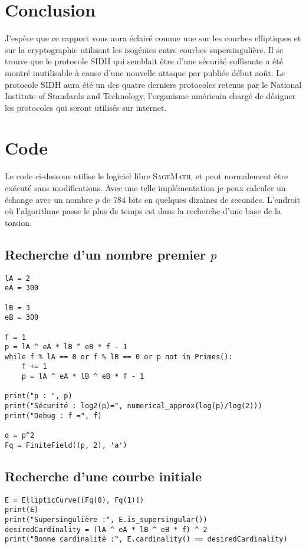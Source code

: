 \documentclass{article}
\theoremstyle{plain}%
\theoremstyle{definition}%
\begin{document}
\section*{Conclusion}

J'espère que ce rapport vous aura éclairé comme une sur les courbes elliptiques et sur la cryptographie utilisant les isogénies entre courbes supersingulière. Il se trouve que le protocole SIDH qui semblait être d'une sécurité suffisante a été montré inutilisable à cause d'une nouvelle attaque par \cite{castryck} publiée début août. Le protocole SIDH aura été un des quatre derniers protocoles retenus par le National Institute of Standards and Technology, l'organisme américain chargé de désigner les protocoles qui seront utilisés sur internet.






\appendix

\section{Code}

Le code ci-dessous utilise le logiciel libre \textsc{SageMath}, et peut normalement être exécuté sans modifications. Avec une telle implémentation je peux calculer un échange avec un nombre $p$ de $784$ bits en quelques dizaines de secondes. L'endroit où l'algorithme passe le plus de temps est dans la recherche d'une base de la torsion. 

\subsection*{Recherche d'un nombre premier $p$}
\begin{verbatim}
lA = 2
eA = 300

lB = 3
eB = 300

f = 1
p = lA ^ eA * lB ^ eB * f - 1
while f % lA == 0 or f % lB == 0 or p not in Primes():
    f += 1 
    p = lA ^ eA * lB ^ eB * f - 1
    
print("p : ", p)
print("Sécurité : log2(p)=", numerical_approx(log(p)/log(2)))
print("Debug : f =", f)

q = p^2
Fq = FiniteField((p, 2), 'a')
\end{verbatim}

\subsection*{Recherche d'une courbe initiale}
\begin{verbatim}
E = EllipticCurve([Fq(0), Fq(1)])
print(E)
print("Supersingulière :", E.is_supersingular())
desiredCardinality = (lA ^ eA * lB ^ eB * f) ^ 2
print("Bonne cardinalité :", E.cardinality() == desiredCardinality)
\end{verbatim}
\end{document}
